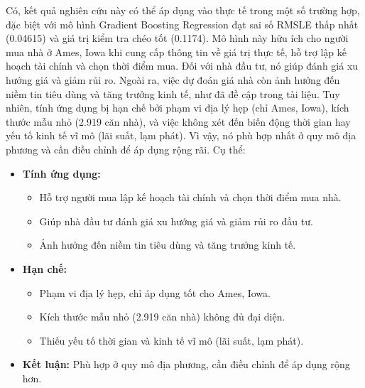 Có, kết quả nghiên cứu này có thể áp dụng vào thực tế trong một số trường hợp, đặc biệt với mô hình Gradient Boosting Regression đạt sai số RMSLE thấp nhất (0.04615) và giá trị kiểm tra chéo tốt (0.1174). Mô hình này hữu ích cho người mua nhà ở Ames, Iowa khi cung cấp thông tin về giá trị thực tế, hỗ trợ lập kế hoạch tài chính và chọn thời điểm mua. Đối với nhà đầu tư, nó giúp đánh giá xu hướng giá và giảm rủi ro. Ngoài ra, việc dự đoán giá nhà còn ảnh hưởng đến niềm tin tiêu dùng và tăng trưởng kinh tế, như đã đề cập trong tài liệu. Tuy nhiên, tính ứng dụng bị hạn chế bởi phạm vi địa lý hẹp (chỉ Ames, Iowa), kích thước mẫu nhỏ (2.919 căn nhà), và việc không xét đến biến động thời gian hay yếu tố kinh tế vĩ mô (lãi suất, lạm phát). Vì vậy, nó phù hợp nhất ở quy mô địa phương và cần điều chỉnh để áp dụng rộng rãi. Cụ thể:
\begin{itemize}
    \item \textbf{Tính ứng dụng:} 
    \begin{itemize}
        \item Hỗ trợ người mua lập kế hoạch tài chính và chọn thời điểm mua nhà.
        \item Giúp nhà đầu tư đánh giá xu hướng giá và giảm rủi ro đầu tư.
        \item Ảnh hưởng đến niềm tin tiêu dùng và tăng trưởng kinh tế.
    \end{itemize}
    \item \textbf{Hạn chế:} 
    \begin{itemize}
        \item Phạm vi địa lý hẹp, chỉ áp dụng tốt cho Ames, Iowa.
        \item Kích thước mẫu nhỏ (2.919 căn nhà) không đủ đại diện.
        \item Thiếu yếu tố thời gian và kinh tế vĩ mô (lãi suất, lạm phát).
    \end{itemize}
    \item \textbf{Kết luận:} Phù hợp ở quy mô địa phương, cần điều chỉnh để áp dụng rộng hơn.
\end{itemize}